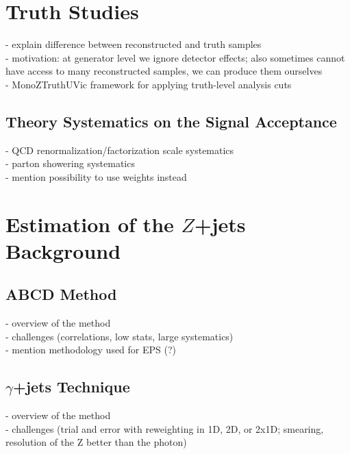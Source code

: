 \section{Truth Studies} 

- explain difference between reconstructed and truth samples\\
- motivation: at generator level we ignore detector effects; also sometimes cannot have access to many reconstructed samples, we can produce them ourselves\\
- MonoZTruthUVic framework for applying truth-level analysis cuts\\

\subsection{Theory Systematics on the Signal Acceptance}
- QCD renormalization/factorization scale systematics\\
- parton showering systematics\\
- mention possibility to use weights instead\\

\section{Estimation of the $Z$+jets Background}

\subsection{ABCD Method}

- overview of the method\\
- challenges (correlations, low stats, large systematics)\\
- mention methodology used for EPS (?)\\

\subsection{$\gamma$+jets Technique}

- overview of the method\\
- challenges (trial and error with reweighting in 1D, 2D, or 2x1D; smearing, resolution of the Z better than the photon)\\

